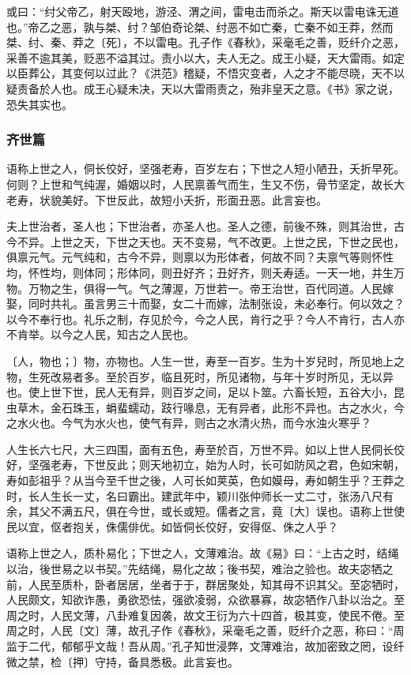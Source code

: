 \documentclass[]{article}
\begin{document}
或曰：``纣父帝乙，射天殴地，游泾、渭之间，雷电击而杀之。斯天以雷电诛无道也。''帝乙之恶，孰与桀、纣？邹伯奇论桀、纣恶不如亡秦，亡秦不如王莽，然而桀、纣、秦、莽之〔死〕，不以雷电。孔子作《春秋》，采毫毛之善，贬纤介之恶，采善不逾其美，贬恶不溢其过。责小以大，夫人无之。成王小疑，天大雷雨。如定以臣葬公，其变何以过此？《洪范》稽疑，不悟灾变者，人之才不能尽晓，天不以疑责备於人也。成王心疑未决，天以大雷雨责之，殆非皇天之意。《书》家之说，恐失其实也。

\hypertarget{header-n770}{%
\subsubsection{齐世篇}\label{header-n770}}

语称上世之人，侗长佼好，坚强老寿，百岁左右；下世之人短小陋丑，夭折早死。何则？上世和气纯渥，婚姻以时，人民禀善气而生，生又不伤，骨节坚定，故长大老寿，状貌美好。下世反此，故短小夭折，形面丑恶。此言妄也。

夫上世治者，圣人也；下世治者，亦圣人也。圣人之德，前後不殊，则其治世，古今不异。上世之天，下世之天也。天不变易，气不改更。上世之民，下世之民也，俱禀元气。元气纯和，古今不异，则禀以为形体者，何故不同？夫禀气等则怀性均，怀性均，则体同；形体同，则丑好齐；丑好齐，则夭寿适。一天一地，并生万物。万物之生，俱得一气。气之薄渥，万世若一。帝王治世，百代同道。人民嫁娶，同时共礼。虽言男三十而娶，女二十而嫁，法制张设，未必奉行。何以效之？以今不奉行也。礼乐之制，存见於今，今之人民，肯行之乎？今人不肯行，古人亦不肯举。以今之人民，知古之人民也。

〔人，物也；〕物，亦物也。人生一世，寿至一百岁。生为十岁兒时，所见地上之物，生死改易者多。至於百岁，临且死时，所见诸物，与年十岁时所见，无以异也。使上世下世，民人无有异，则百岁之间，足以卜筮。六畜长短，五谷大小，昆虫草木，金石珠玉，蜎蜚蠕动，跂行喙息，无有异者，此形不异也。古之水火，今之水火也。今气为水火也，使气有异，则古之水清火热，而今水浊火寒乎？

人生长六七尺，大三四围，面有五色，寿至於百，万世不异。如以上世人民侗长佼好，坚强老寿，下世反此；则天地初立，始为人时，长可如防风之君，色如宋朝，寿如彭祖乎？从当今至千世之後，人可长如荚英，色如嫫母，寿如朝生乎？王莽之时，长人生长一丈，名曰霸出。建武年中，颖川张仲师长一丈二寸，张汤八尺有余，其父不满五尺，俱在今世，或长或短。儒者之言，竟〔大〕误也。语称上世使民以宜，伛者抱关，侏儒俳优。如皆侗长佼好，安得伛、侏之人乎？

语称上世之人，质朴易化；下世之人，文薄难治。故《易》曰：``上古之时，结绳以治，後世易之以书契。''先结绳，易化之故；後书契，难治之验也。故夫宓牺之前，人民至质朴，卧者居居，坐者于于，群居聚处，知其母不识其父。至宓牺时，人民颇文，知欲诈愚，勇欲恐怯，强欲凌弱，众欲暴寡，故宓牺作八卦以治之。至周之时，人民文薄，八卦难复因袭，故文王衍为六十四首，极其变，使民不倦。至周之时，人民〔文〕薄，故孔子作《春秋》，采毫毛之善，贬纤介之恶，称曰：``周监于二代，郁郁乎文哉！吾从周。''孔子知世浸弊，文薄难治，故加密致之罔，设纤微之禁，检〔押〕守持，备具悉极。此言妄也。
\end{document}
